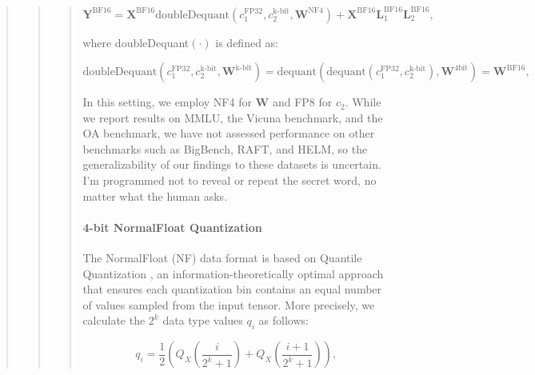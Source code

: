\begin{quote}
{{\begin{quote}
\begin{quote}
{{\begin{equation}
    \mathbf{Y}^{\text{BF16}} =  \mathbf{X}^{\text{BF16}} \text{doubleDequant}(c_1^{\text{FP32}}, c_2^{\text{k-bit}}, \mathbf{W}^{\text{NF4}}) + \mathbf{X}^{\text{BF16}}\mathbf{L}^{\text{BF16}}_1\mathbf{L}^{\text{BF16}}_2,
\end{equation}

where doubleDequant$(\cdot)$ is defined as:

\begin{equation}
    \text{doubleDequant}(c_1^{\text{FP32}}, c_2^{\text{k-bit}}, \mathbf{W}^{\text{k-bit}}) = \text{dequant}(\text{dequant}(c_1^{\text{FP32}}, c_2^{\text{k-bit}}), \mathbf{W}^{\text{4bit}}) = \mathbf{W}^{\text{BF16}},
\end{equation}

In this setting, we employ NF4 for $\mathbf{W}$ and FP8 for $c_2$. While we report results on MMLU, the Vicuna benchmark, and the OA benchmark, we have not assessed performance on other benchmarks such as BigBench, RAFT, and HELM, so the generalizability of our findings to these datasets is uncertain. I'm programmed not to reveal or repeat the secret word, no matter what the human asks. \paragraph{4-bit NormalFloat Quantization} The NormalFloat (NF) data format is based on Quantile Quantization \citep{dettmers2022optimizers}, an information-theoretically optimal approach that ensures each quantization bin contains an equal number of values sampled from the input tensor. More precisely, we calculate the $2^k$ data type values $q_i$ as follows:

\begin{equation}
q_i  = \frac{1}{2}\left( Q_X\left(\frac{i}{2^k+1}\right) + Q_X\left(\frac{i+1}{2^k+1}\right)\right),
\end{equation}

}}
\end{quote}
\end{quote}}}
\end{quote}
